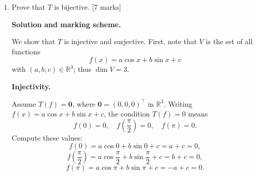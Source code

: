 \documentclass{article}
\begin{document}
\begin{enumerate}[label=(\alph*)]
\begin{mdframed}[linecolor=black, linewidth=1pt]
    Similarly, for any $\alpha\in\mathbb{R}$ and $f\in V$,
    \[
    (\alpha f)(x) = \alpha f(x),
    \]
    so
    \[
    T(\alpha f) =
    \begin{bmatrix}
    (\alpha f)(0) \\[0.2em]
    (\alpha f)\!\left(\dfrac{\pi}{2}\right) \\[0.2em]
    (\alpha f)(\pi)
    \end{bmatrix}
    =
    \begin{bmatrix}
    \alpha f(0) \\[0.2em] \alpha f\!\left(\dfrac{\pi}{2}\right) \\[0.2em] \alpha f(\pi)
    \end{bmatrix}
    =
    \alpha
    \begin{bmatrix}
    f(0) \\[0.2em] f\!\left(\dfrac{\pi}{2}\right) \\[0.2em] f(\pi)
    \end{bmatrix}
    = \alpha\,T(f).
    \]
    
    Thus $T$ is linear.
    
    \textbf{Marks (5):}
    \begin{itemize}
      \item 2 marks: correct verification that $T(f+g)=T(f)+T(g)$ using componentwise evaluation.
      \item 2 marks: correct verification that $T(\alpha f)=\alpha T(f)$.
      \item 1 mark: clear statement that both properties hold and therefore $T$ is linear.
    \end{itemize}
    \end{mdframed}
    
    \item Prove that $T$ is bijective. [7 marks]

    \begin{mdframed}[linecolor=black, linewidth=1pt]

    \textbf{Solution and marking scheme.}

    We show that $T$ is injective and surjective. First, note that $V$ is the set of all functions
    \[
    f(x) = a\cos x + b\sin x + c
    \]
    with $(a,b,c)\in\mathbb{R}^3$; thus $\dim V = 3$.
    
    \medskip
    \textbf{Injectivity.}
    
    Assume $T(f)=\mathbf{0}$, where $\mathbf{0}=(0,0,0)^{\top}$ in $\mathbb{R}^3$. Writing $f(x)=a\cos x + b\sin x + c$, the condition $T(f)=0$ means
    \[
    f(0)=0,\quad f\!\left(\frac{\pi}{2}\right)=0,\quad f(\pi)=0.
    \]
    Compute these values:
    \[
    f(0) = a\cos0 + b\sin0 + c = a + c = 0,
    \]
    \[
    f\!\left(\frac{\pi}{2}\right) = a\cos\frac{\pi}{2} + b\sin\frac{\pi}{2} + c = b + c = 0,
    \]
    \[
    f(\pi) = a\cos\pi + b\sin\pi + c = -a + c = 0.
    \]
    

\end{mdframed}
\end{enumerate}
\end{document}
